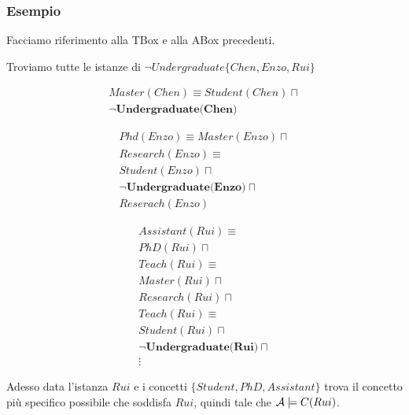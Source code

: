 \documentclass[../main.tex]{subfiles}
\begin{document}
   \subsubsection{Esempio}
   Facciamo riferimento alla TBox e alla ABox precedenti.
   \begin{center}
      Troviamo tutte le istanze di $\lnot Undergraduate\{Chen, Enzo, Rui\}$
   \end{center}
   \begin{minipage}{0.3333\textwidth}
      \begin{gather*}
         Master(Chen) \equiv Student(Chen) \sqcap\\
         \lnot \textbf{Undergraduate(Chen)}
      \end{gather*}
   \end{minipage}
   \begin{minipage}{0.3333\textwidth}
      \begin{gather*}
         Phd(Enzo) \equiv
         Master(Enzo) \sqcap\\
         Research(Enzo) \equiv\\
         Student(Enzo) \sqcap\\
         \lnot \textbf{Undergraduate(Enzo)} \sqcap\\
         Reserach(Enzo)
      \end{gather*}
   \end{minipage}
   \begin{minipage}{0.3333\textwidth}
      \begin{gather*}
         Assistant(Rui) \equiv\\
         PhD(Rui) \sqcap\\
         Teach(Rui) \equiv\\
         Master(Rui) \sqcap\\
         Research(Rui) \sqcap\\
         Teach(Rui) \equiv\\
         Student(Rui) \sqcap\\
         \lnot \textbf{Undergraduate(Rui)} \sqcap\\
         \vdots
      \end{gather*}
   \end{minipage}
   \spazio
   \begin{center}
      Adesso data l'istanza $Rui$ e i concetti $\{ Student, PhD, Assistant \}$ trova il concetto più specifico possibile che soddisfa $Rui$, quindi tale che $\mathcal{A} \models C(Rui)$.
   \end{center}
\end{document}
